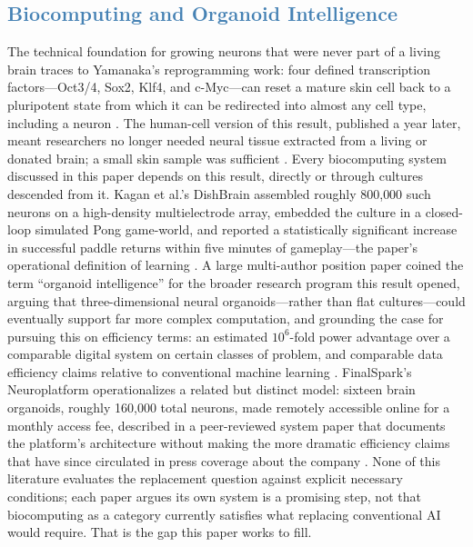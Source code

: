 \documentclass[journal]{IEEEtran}
\begin{document}
\subsection{\textcolor{steelblue}{Biocomputing and Organoid Intelligence}}

The technical foundation for growing neurons that were never part of a living brain
traces to Yamanaka's reprogramming work: four defined transcription
factors---Oct3/4, Sox2, Klf4, and c-Myc---can reset a mature skin cell back to a
pluripotent state from which it can be redirected into almost any cell type,
including a neuron \cite{takahashi2006induction}. The human-cell version of this
result, published a year later, meant researchers no longer needed neural tissue
extracted from a living or donated brain; a small skin sample was sufficient
\cite{takahashi2007induction}. Every biocomputing system discussed in this paper
depends on this result, directly or through cultures descended from it. Kagan et
al.'s DishBrain assembled roughly 800{,}000 such neurons on a high-density
multielectrode array, embedded the culture in a closed-loop simulated Pong
game-world, and reported a statistically significant increase in successful paddle
returns within five minutes of gameplay---the paper's operational definition of
learning \cite{kagan2022dishbrain}. A large multi-author position paper coined the
term ``organoid intelligence'' for the broader research program this result opened,
arguing that three-dimensional neural organoids---rather than flat cultures---could
eventually support far more complex computation, and grounding the case for pursuing
this on efficiency terms: an estimated $10^{6}$-fold power advantage over a
comparable digital system on certain classes of problem, and comparable data
efficiency claims relative to conventional machine learning \cite{smirnova2023organoid}.
FinalSpark's Neuroplatform operationalizes a related but distinct model: sixteen
brain organoids, roughly 160{,}000 total neurons, made remotely accessible online for
a monthly access fee, described in a peer-reviewed system paper that documents the
platform's architecture without making the more dramatic efficiency claims that have
since circulated in press coverage about the company \cite{jordan2024open}. None of
this literature evaluates the replacement question against explicit necessary
conditions; each paper argues its own system is a promising step, not that biocomputing
as a category currently satisfies what replacing conventional AI would require. That
is the gap this paper works to fill.
\end{document}
